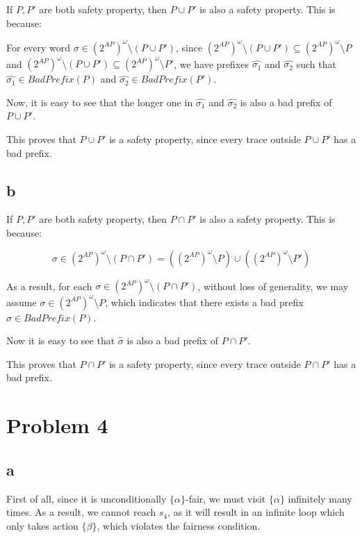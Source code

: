 If $P, P'$ are both safety property, then $P \cup P'$ is also a safety property.
This is because:

\newcommand{\bad}[1]{\textit{BadPrefix}(#1)}
\newcommand{\whole}{(2^{AP})^\omega}

For every word $\sigma \in \whole \setminus (P \cup P')$,
since $\whole \setminus (P \cup P') \subseteq \whole \setminus P$
and $\whole \setminus (P \cup P') \subseteq \whole \setminus P'$,
we have prefixes $\hat{\sigma_1}$ and $\hat{\sigma_2}$ such that
$\hat{\sigma_1} \in \bad{P}$ and $\hat{\sigma_2} \in \bad{P'}$.

Now, it is easy to see that the longer one in $\hat{\sigma_1}$ and
$\hat{\sigma_2}$ is also a bad prefix of $P \cup P'$.

This proves that $P \cup P'$ is a safety property,
since every trace outside $P \cup P'$ has a bad prefix.

\subsection{b}

If $P, P'$ are both safety property, then $P \cap P'$ is also a safety property.
This is because:

$$
\sigma \in \whole \setminus (P \cap P')
= (\whole \setminus P) \cup (\whole \setminus P')
$$

As a result, for each $\sigma \in \whole \setminus (P \cap P')$,
without loss of generality, we may assume $\sigma \in \whole \setminus P$,
which indicates that there exists a bad prefix $\hat{\sigma} \in \bad{P}$.

Now it is easy to see that $\hat{\sigma}$ is also a bad prefix of $P \cap P'$.

This proves that $P \cap P'$ is a safety property,
since every trace outside $P \cap P'$ has a bad prefix.

\section{Problem 4}

\subsection{a}

\newcommand{\aaa}{\{\alpha\}}
\newcommand{\bb}{\{\beta\}}
\newcommand{\ee}{\{\eta\}}
\newcommand{\Act}{\textit{Act}}

First of all, since it is unconditionally $\aaa$-fair, we must visit $\aaa$ infinitely many times.
As a result, we cannot reach $s_4$, as it will result in an infinite loop which only takes action
$\bb$, which violates the fairness condition.

